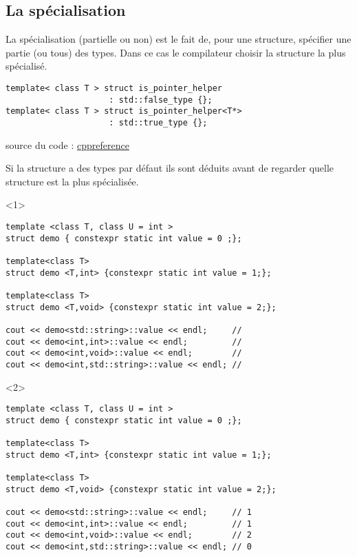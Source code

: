 \documentclass{beamer}
\begin{document}
\subsection{La spécialisation}

\begin{frame}[containsverbatim]
	La spécialisation (partielle ou non) est le fait de, pour une structure, spécifier une partie (ou tous) des types. Dans ce cas le compilateur choisir la structure la plus spécialisé.\\
	
	\begin{lstlisting}
template< class T > struct is_pointer_helper    
                     : std::false_type {};
template< class T > struct is_pointer_helper<T*> 
                     : std::true_type {};
	\end{lstlisting}
	source du code : \href{http://en.cppreference.com/w/cpp/types/is_pointer}{cppreference}
\end{frame}

\begin{frame}[fragile]
	Si la structure a des types par défaut ils sont déduits avant de regarder quelle structure est la plus spécialisée.
\begin{onlyenv}<1>
	\begin{lstlisting}
template <class T, class U = int >
struct demo { constexpr static int value = 0 ;};

template<class T>
struct demo <T,int> {constexpr static int value = 1;};

template<class T>
struct demo <T,void> {constexpr static int value = 2;};

cout << demo<std::string>::value << endl;     // 
cout << demo<int,int>::value << endl;         // 
cout << demo<int,void>::value << endl;        // 
cout << demo<int,std::string>::value << endl; // 
	\end{lstlisting}
\end{onlyenv}
\begin{onlyenv}<2>
	\begin{lstlisting}
template <class T, class U = int >
struct demo { constexpr static int value = 0 ;};

template<class T>
struct demo <T,int> {constexpr static int value = 1;};

template<class T>
struct demo <T,void> {constexpr static int value = 2;};

cout << demo<std::string>::value << endl;     // 1
cout << demo<int,int>::value << endl;         // 1
cout << demo<int,void>::value << endl;        // 2
cout << demo<int,std::string>::value << endl; // 0
	\end{lstlisting}
\end{onlyenv}
	
\end{frame}
\end{document}
